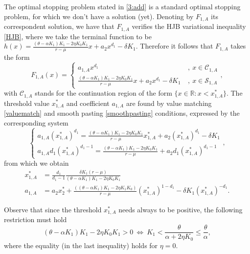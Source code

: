 The optimal stopping problem stated in \eqref{3:add} is a standard optimal stopping problem, for which we don't have a solution (yet).
Denoting by $F_{1,A}$ its correspondent solution, we have that $F_{1,A}$ verifies the HJB variational inequality \eqref{HJB}, where we take the terminal function to be $h(x)=\frac{(\theta-\alpha K_1)K_1-2 \eta K_0 K_1}{r-\mu} x+
a_2 x^{d_1} - \delta K_1$. Therefore it follows that $F_{1,A}$ takes the form
\begin{equation}
F_{1,A}(x)=\begin{cases} a_{1,A} x^{d_1}  &\ , \ x \in \mathcal{C}_{1,A} \\
\frac{(\theta-\alpha K_1)K_1-2 \eta K_0 K_1}{r-\mu} x+
a_2 x^{d_1} - \delta K_1 &\ , \ x \in \mathcal{S}_{1,A}
\end{cases},
\label{3_F1A}
\end{equation}
with $\mathcal{C}_{1,A}$ stands for the continuation region of the form $\{ x \in \mathds{R}: x<x^*_{1,A} \}$. The threshold value $x_{1,A}^*$ and coefficient $a_{1,A}$ are found by value matching \eqref{valuematch} and smooth pasting \eqref{smoothpasting} conditions, expressed by the corresponding system
\begin{equation}
\begin{cases} a_{1,A} (x_{1,A}^*)^{d_1}=\frac{(\theta-\alpha K_1)K_1-2 \eta K_0 K_1}{r-\mu} x_{1,A}^*+
a_2 (x_{1,A}^*)^{d_1} - \delta K_1\\
a_{1,A} d_1(x_{1,A}^*)^{d_1-1}=\frac{(\theta-\alpha K_1)K_1-2 \eta K_0 K_1}{r-\mu}+
a_2 d_1 (x_{1,A}^*)^{d_1-1}
\end{cases},
\label{eq:3_sistema}
\end{equation}
from which we obtain
\begin{align}
x_{1,A}^*&=\frac{d_1}{d_1-1} \frac{\delta K_1 (r-\mu )}{ (\theta -\alpha  K_1)K_1-2 \eta  K_0 K_1} \label{eq:3_x1A}\\
a_{1,A}&=
a_2 x^*_2+\frac{((\theta -\alpha  K_1)K_1-2 \eta  K_1 K_0) }{r-\mu }(x_{1,A}^*)^{1-d_1}-\delta K_1 (x_{1,A}^*)^{-d_1}.
\label{3:a1A} 
\end{align}

Observe that since the threshold $x_{1,A}^*$ needs always to be positive, the following restriction must hold
\begin{equation}
	(\theta -\alpha  K_1)K_1-2 \eta  K_0 K_1>0 \ \Leftrightarrow \ K_1 < \frac{\theta}{\alpha + 2\eta K_0} \leq \frac{\theta}{\alpha},
	\label{3_cond}
\end{equation}
where the equality (in the last inequality) holds for $\eta=0$. 

